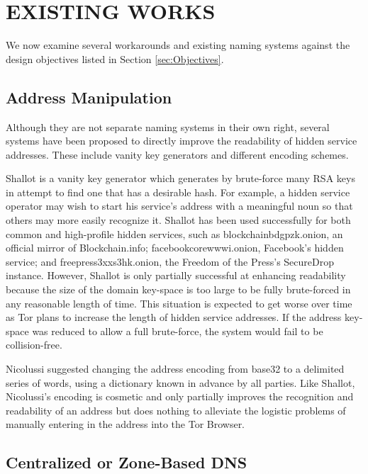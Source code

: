 
\chapter{EXISTING WORKS}
\label{ch:ExistingWorks}

We now examine several workarounds and existing naming systems against the design objectives listed in Section \ref{sec:Objectives}.

\section{Address Manipulation}

Although they are not separate naming systems in their own right, several systems have been proposed to directly improve the readability of hidden service addresses. These include vanity key generators and different encoding schemes.

Shallot is a vanity key generator which generates by brute-force many RSA keys in attempt to find one that has a desirable hash\cite{KatmagicShallot}. For example, a hidden service operator may wish to start his service's address with a meaningful noun so that others may more easily recognize it. Shallot has been used successfully for both common and high-profile hidden services, such as blockchainbdgpzk.onion, an official mirror of Blockchain.info; facebookcorewwwi.onion, Facebook's hidden service; and  freepress3xxs3hk.onion, the Freedom of the Press's SecureDrop instance. However, Shallot is only partially successful at enhancing readability because the size of the domain key-space is too large to be fully brute-forced in any reasonable length of time\cite{KatmagicShallot}. This situation is expected to get worse over time as Tor plans to increase the length of hidden service addresses\cite{Proposal224}. If the address key-space was reduced to allow a full brute-force, the system would fail to be collision-free.

Nicolussi suggested changing the address encoding from base32 to a delimited series of words, using a dictionary known in advance by all parties\cite{nicolussi2011human}. Like Shallot, Nicolussi's encoding is cosmetic and only partially improves the recognition and readability of an address but does nothing to alleviate the logistic problems of manually entering in the address into the Tor Browser.

\section{Centralized or Zone-Based DNS}

